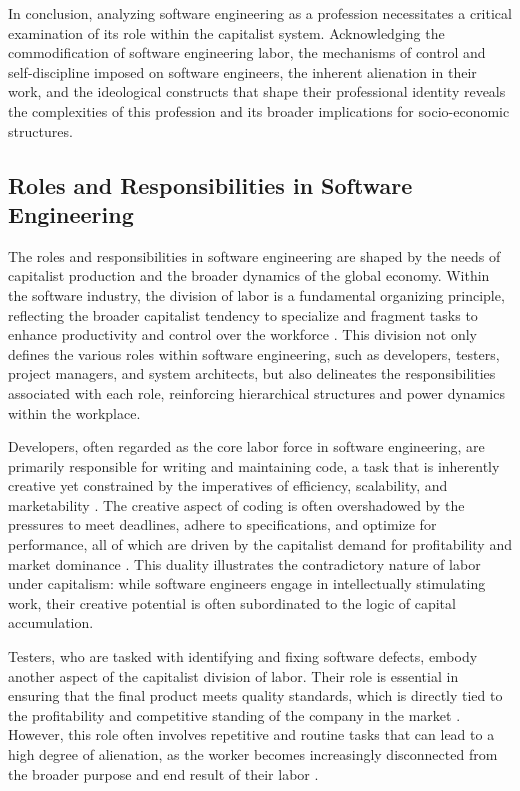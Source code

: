 \begin{refsection}
In conclusion, analyzing software engineering as a profession necessitates a critical examination of its role within the capitalist system. Acknowledging the commodification of software engineering labor, the mechanisms of control and self-discipline imposed on software engineers, the inherent alienation in their work, and the ideological constructs that shape their professional identity reveals the complexities of this profession and its broader implications for socio-economic structures.

\subsection{Roles and Responsibilities in Software Engineering}

The roles and responsibilities in software engineering are shaped by the needs of capitalist production and the broader dynamics of the global economy. Within the software industry, the division of labor is a fundamental organizing principle, reflecting the broader capitalist tendency to specialize and fragment tasks to enhance productivity and control over the workforce \cite[pp.~103-107]{braverman1974labor}. This division not only defines the various roles within software engineering, such as developers, testers, project managers, and system architects, but also delineates the responsibilities associated with each role, reinforcing hierarchical structures and power dynamics within the workplace.

Developers, often regarded as the core labor force in software engineering, are primarily responsible for writing and maintaining code, a task that is inherently creative yet constrained by the imperatives of efficiency, scalability, and marketability \cite[pp.~415-418]{marx2008capital}. The creative aspect of coding is often overshadowed by the pressures to meet deadlines, adhere to specifications, and optimize for performance, all of which are driven by the capitalist demand for profitability and market dominance \cite[pp.~28-32]{braverman1974labor}. This duality illustrates the contradictory nature of labor under capitalism: while software engineers engage in intellectually stimulating work, their creative potential is often subordinated to the logic of capital accumulation.

Testers, who are tasked with identifying and fixing software defects, embody another aspect of the capitalist division of labor. Their role is essential in ensuring that the final product meets quality standards, which is directly tied to the profitability and competitive standing of the company in the market \cite[pp.~56-59]{braverman1974labor}. However, this role often involves repetitive and routine tasks that can lead to a high degree of alienation, as the worker becomes increasingly disconnected from the broader purpose and end result of their labor \cite[pp.~482-485]{marx2008capital}.


\end{refsection}
